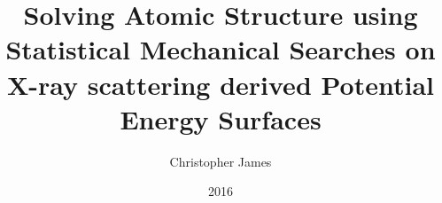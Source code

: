 \documentclass{uscthesis}
\title{Solving Atomic Structure using Statistical Mechanical Searches on X-ray scattering derived Potential Energy Surfaces}
\author{Christopher James}{Wright}    %
\date{2016}                      %
\theoremstyle{definition}
\theoremstyle{plain}
\begin{document}


       
                           




% 
% 
% 

% 




\Appendix                 %
	
\end{document}

